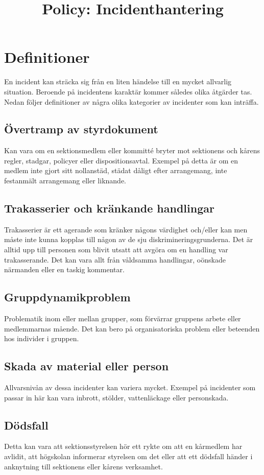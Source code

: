 \documentclass{dtek}
\title{Policy: Incidenthantering}
\begin{document}
\maketitle

\section{Definitioner}
En incident kan sträcka sig från en liten händelse till en mycket allvarlig situation. Beroende på incidentens karaktär kommer således olika åtgärder tas. Nedan följer definitioner av några olika kategorier av incidenter som kan inträffa.

\subsection{Övertramp av styrdokument}
Kan vara om en sektionsmedlem eller kommitté bryter mot sektionens och kårens regler, stadgar, policyer eller dispositionsavtal. Exempel på detta är om en medlem inte gjort sitt nollanstäd, städat dåligt efter arrangemang, inte festanmält arrangemang eller liknande.

\subsection{Trakasserier och kränkande handlingar}
Trakasserier är ett agerande som kränker någons värdighet och/eller kan men måste inte kunna kopplas till någon av de sju diskrimineringsgrunderna. Det är alltid upp till personen som blivit utsatt att avgöra om en handling var trakasserande. Det kan vara allt från våldsamma handlingar, oönskade närmanden eller en taskig kommentar. 

\subsection{Gruppdynamikproblem}
Problematik inom eller mellan grupper, som förvärrar gruppens arbete eller medlemmarnas mående. Det kan bero på organisatoriska problem eller beteenden hos individer i gruppen.

\subsection{Skada av material eller person}
Allvarsnivån av dessa incidenter kan variera mycket. Exempel på incidenter som passar in här kan vara inbrott, stölder, vattenläckage eller personskada.

\subsection{Dödsfall}
Detta kan vara att sektionsstyrelsen hör ett rykte om att en kårmedlem har avlidit, att högskolan informerar styrelsen om det eller att ett dödsfall händer i anknytning till sektionens eller kårens verksamhet.
\end{document}
